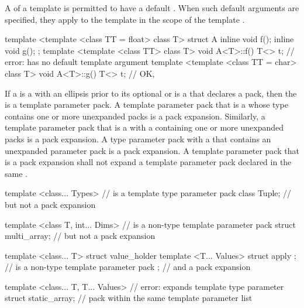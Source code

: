 \pnum
A
of a template
is permitted to have a default
.
When such default arguments are specified, they apply to the template
in the scope of the template
.
\begin{example}
\begin{codeblock}
template <template <class TT = float> class T> struct A {
  inline void f();
  inline void g();
};
template <template <class TT> class T> void A<T>::f() {
  T<> t;            // error:  has no default template argument
}
template <template <class TT = char> class T> void A<T>::g() {
  T<> t;            // OK, 
}
\end{codeblock}
\end{example}

\pnum
If a  is a
 with an ellipsis prior to its
optional  or is a
 that declares a
pack, then the 
is a template parameter pack.
A template parameter pack that is a  whose type
contains one or more unexpanded packs is a pack expansion. Similarly,
a template parameter pack that is a  with a
 containing one or more unexpanded
packs is a pack expansion.
A type parameter pack with a  that
contains an unexpanded parameter pack is a pack expansion.
A template parameter pack that is a pack
expansion shall not expand a template parameter pack declared in the same
.
\begin{example}
\begin{codeblock}
template <class... Types>                       //  is a template type parameter pack
   class Tuple;                                 // but not a pack expansion

template <class T, int... Dims>                 //  is a non-type template parameter pack
   struct multi_array;                          // but not a pack expansion

template <class... T>
  struct value_holder {
    template <T... Values> struct apply { };    //  is a non-type template parameter pack
  };                                            // and a pack expansion

template <class... T, T... Values>              // error:  expands template type parameter
  struct static_array;                          // pack  within the same template parameter list
\end{codeblock}
\end{example}


